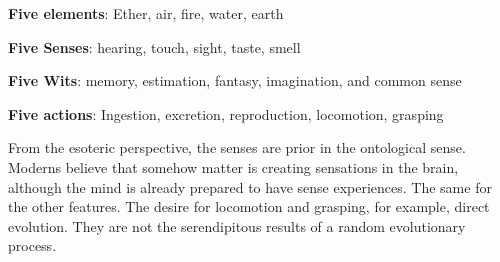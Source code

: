 \textbf{Five elements}: Ether, air, fire, water, earth

\textbf{Five Senses}: hearing, touch, sight, taste, smell

\textbf{Five Wits}: memory, estimation, fantasy, imagination, and common sense

\textbf{Five actions}: Ingestion, excretion, reproduction, locomotion, grasping

From the esoteric perspective, the senses are prior in the ontological sense. Moderns believe that somehow matter is creating sensations in the brain, although the mind is already prepared to have sense experiences. The same for the other features. The desire for locomotion and grasping, for example, direct evolution. They are not the serendipitous results of a random evolutionary process.

